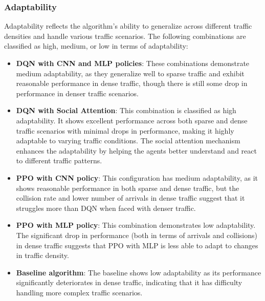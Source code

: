 \subsubsection{Adaptability}
Adaptability reflects the algorithm's ability to generalize across different traffic densities and handle various traffic scenarios. The following combinations are classified as high, medium, or low in terms of adaptability:
\begin{itemize}
    \item \textbf{DQN with CNN and MLP policies}: These combinations demonstrate medium adaptability, as they generalize well to sparse traffic and exhibit reasonable performance in dense traffic, though there is still some drop in performance in denser traffic scenarios.
    \item \textbf{DQN with Social Attention}: This combination is classified as high adaptability. It shows excellent performance across both sparse and dense traffic scenarios with minimal drops in performance, making it highly adaptable to varying traffic conditions. The social attention mechanism enhances the adaptability by helping the agents better understand and react to different traffic patterns.
    \item \textbf{PPO with CNN policy}: This configuration has medium adaptability, as it shows reasonable performance in both sparse and dense traffic, but the collision rate and lower number of arrivals in dense traffic suggest that it struggles more than DQN when faced with denser traffic.
    \item \textbf{PPO with MLP policy}: This combination demonstrates low adaptability. The significant drop in performance (both in terms of arrivals and collisions) in dense traffic suggests that PPO with MLP is less able to adapt to changes in traffic density.
    \item \textbf{Baseline algorithm}: The baseline shows low adaptability as its performance significantly deteriorates in dense traffic, indicating that it has difficulty handling more complex traffic scenarios.
\end{itemize}





